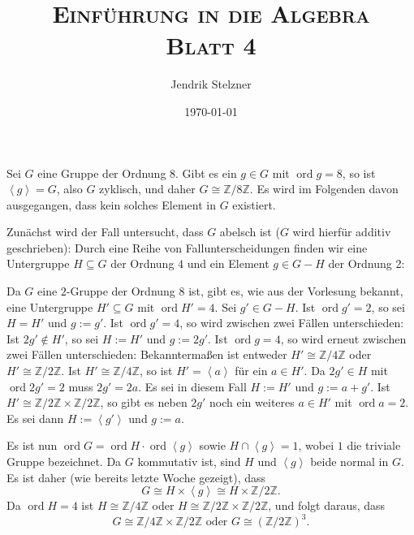 \documentclass[a4paper,10pt]{article}
\title{\textsc{Einführung in die Algebra \\ \Large Blatt 4}}
\author{Jendrik Stelzner}
\date{\today}
\theoremstyle{definition}
\newcommand{\Z}{\mathbb{Z}}
\newcommand{\ord}{\operatorname{ord}}
\newcommand{\gen}[1]{\left\langle#1\right\rangle}
\begin{document}
\maketitle





\section{}
Sei $G$ eine Gruppe der Ordnung $8$. Gibt es ein $g \in G$ mit $\ord g = 8$, so ist $\gen{g} = G$, also $G$ zyklisch, und daher $G \cong \Z/8\Z$. Es wird im Folgenden davon ausgegangen, dass kein solches Element in $G$ existiert.

Zunächst wird der Fall untersucht, dass $G$ abelsch ist ($G$ wird hierfür additiv geschrieben): Durch eine Reihe von Fallunterscheidungen finden wir eine Untergruppe $H \subseteq G$ der Ordnung $4$ und ein Element $g \in G-H$ der Ordnung 2:

Da $G$ eine $2$-Gruppe der Ordnung $8$ ist, gibt es, wie aus der Vorlesung bekannt, eine Untergruppe $H' \subseteq G$ mit $\ord H' = 4$. Sei $g' \in G-H$. Ist $\ord g' = 2$, so sei $H = H'$ und $g := g'$.
Ist $\ord g' = 4$, so wird zwischen zwei Fällen unterschieden: Ist $2g' \not\in H'$, so sei $H := H'$ und $g := 2g'$. Ist $\ord g = 4$, so wird erneut zwischen zwei Fällen unterschieden: Bekanntermaßen ist entweder $H' \cong \Z/4\Z$ oder $H' \cong \Z/2\Z$. Ist $H' \cong \Z/4\Z$, so ist $H' = \gen{a}$ für ein $a \in H'$. Da $2g' \in H$ mit $\ord 2g' = 2$ muss $2g' = 2a$. Es sei in diesem Fall $H := H'$ und $g := a+g'$. Ist $H' \cong \Z/2\Z \times \Z/2\Z$, so gibt es neben $2g'$ noch ein weiteres $a \in H'$ mit $\ord a = 2$. Es sei dann $H := \gen{g'}$ und $g := a$.

Es ist nun $\ord G = \ord H \cdot \ord \gen{g}$ sowie $H \cap \gen{g} = 1$, wobei $1$ die triviale Gruppe bezeichnet. Da $G$ kommutativ ist, sind $H$ und $\gen{g}$ beide normal in $G$. Es ist daher (wie bereits letzte Woche gezeigt), dass
\[
 G \cong H \times \gen{g} \cong H \times \Z/2\Z.
\]
Da $\ord H = 4$ ist $H \cong \Z/4\Z$ oder $H \cong \Z/2\Z \times \Z/2\Z$, und folgt daraus, dass
\[
 G \cong \Z/4\Z \times \Z/2\Z \text{ oder } G \cong (\Z/2\Z)^3.
\]
\end{document}
